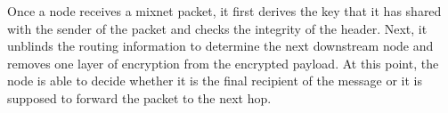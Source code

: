 Once a node receives a mixnet packet, it first derives the key that it has shared with the sender of the packet and checks the integrity of the header. Next, it unblinds the routing information to determine the next downstream node and removes one layer of encryption from the encrypted payload. At this point, the node is able to decide whether it is the final recipient of the message or it is supposed to forward the packet to the next hop.

\begin{comment}
\paragraph{Notation:}Let $\kappa=128$ be the security parameter. With non-negligible probability, an adversary must perform around $2^\kappa$ operations to break the security of Sphinx.

Let $r$ be the maximum number of nodes that a Sphinx mix message will traverse before being delivered to its destination.

$G$ is a prime order cyclic group satisfying the decisional Diffie-Hellman assumption \cite{Boneh_1998}. We use the secp256k1 elliptic curve \cite{secp}. The element $g$ is a generator of $G$ and $q$ is the (prime) order of $G$, with $q\approx2^{2*\kappa}$.

$G^*$ is the set of non-identity elements of G. $h_b$ is a pre-image resistant hash function used to compute blinding factors and modelled as a random oracle such that
$h_b:G^*\times G^*\rightarrow\mathbb{Z}^*_q$, where $\mathbb{Z}^*_q$ is the field of non-identity elements of $\mathbb{Z}_q$ (field of integers). We use the BLAKE2s hash function \cite{blake2}.

Each node $i$ has a private key $x_{i}\in \mathbb{Z}^*_q$ and a public key $y_{i}=g^{x_{i}}\in G^*$.
$\alpha_i$ is the group elements which, when combined with the nodes’ public keys, allow a shared key to be computed for each via Diffie-Hellman (DH) key exchange. This ensures that each node in the user-chosen route can forward the packet to the next, and only the receiving mix node can decrypt it.
$s_i$ are the DH shared secrets, $b_i$ are the blinding factors.
\end{comment}










